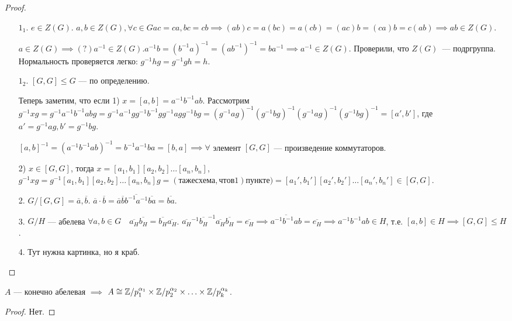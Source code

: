 \begin{proof}
    \begin{enumerate}
        \item[$1_1$.] $e \in Z(G)$.  $a, b \in Z(G), \forall c \in G ac = ca, bc = cb \implies (ab)c = a(bc) = a(cb) = (ac)b = (ca)b = c(ab) \implies ab \in Z(G)$.

            $a \in Z(G) \implies(?) a^{-1} \in Z(G). a^{-1}b = (b^{-1}a)^{-1} = (ab^{-1})^{-1} = ba^{-1} \implies a^{-1} \in Z(G)$. Проверили, что $Z(G)$~--- подргруппа. Нормальность проверяется легко: $g^{-1}hg = g^{-1}gh = h$.
        \item[$1_2$.] $[G, G] \le G$ --- по определению. 

            Теперь заметим, что если 1) $x = [a, b] = a^{-1}b^{-1}ab$. Рассмотрим  $g^{-1}xg = g^{-1}a^{-1}b^{-1}abg = g^{-1}a^{-1}gg^{-1}b^{-1}gg^{-1}agg^{-1}bg = (g^{-1}ag)^{-1}(g^{-1}bg)^{-1}(g^{-1}ag)^{-1}(g^{-1}bg)^{-1} = [a', b']$, где $a' = g^{-1}ag, b' = g^{-1}bg$.

            $[a, b]^{-1} = (a^{-1}b^{-1}ab)^{-1} = b^{-1}a^{-1}ba = [b, a] \implies \forall $ элемент  $[G, G]$ --- произведение коммутаторов. 

             2) $x \in [G, G]$, тогда  $x = [a_1, b_1][a_2,b_2]\ldots[a_n, b_n]$, $g^{-1}xg = g^{-1}[a_1, b_1][a_2, b_2]\ldots[a_n, b_n]g = (та же схема, что в 1) пункте) = [a_1', b_1'][a_2', b_2']\ldots[a_n', b_n'] \in [G, G]$.
         \item[2.] $G / [G, G] = \overline{a}, \overline{b}$.  $\overline{a} \cdot \overline{b} = \overline{a}\overline{b}\overline{b^{-1}a^{-1}}\overline{ba} = \overline{ba}$.
         \item[3.] $G / H$ --- абелева  $\forall a, b \in G\quad \overline{a_H} \overline{b_H} = \overline{b_H}\overline{a_H}$.  $\overline{a_H}^{-1}\overline{b_H}^{-1} \overline{a_H}\overline{b_H} = \overline{e_H} \implies \overline{a^{-1} b^{-1}ab} = \overline{e_H} \implies a^{-1}b^{-1}ab \in H$, т.е. $[a, b] \in H \implies [G, G] \le H$.
         \item[4.] Тут нужна картинка, но я краб.
    \end{enumerate}
\end{proof}
\begin{theorem}
    $A$ --- конечно абелевая  $\implies$  $A \cong \mathbb{Z} / p_1^{\alpha_1} \times \mathbb{Z} / p_2^{\alpha_2} \times \ldots \times \mathbb{Z} / p_k^{\alpha_k}$.
\end{theorem}
\begin{proof}
    Нет.
\end{proof}
